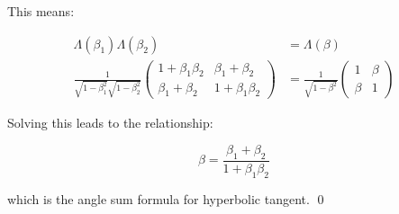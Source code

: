 \documentclass[12pt]{article}
\begin{document}
This means:

\begin{equation}
    \begin{split}
        \Lambda(\beta_{1}) \Lambda(\beta_{2}) &= \Lambda(\beta) \\
        \frac{1}{\sqrt{1 - \beta_{1}^{2}} \sqrt{1 - \beta_{2}^{2}}} \begin{pmatrix}
            1 + \beta_{1} \beta_{2} & \beta_{1} + \beta_{2}   \\
            \beta_{1} + \beta_{2}   & 1 + \beta_{1} \beta_{2}
        \end{pmatrix}
        &=
        \frac{1}{\sqrt{1 - \beta^{2}}} \begin{pmatrix}
            1     & \beta \\
            \beta & 1
        \end{pmatrix}
    \end{split}
\end{equation}

Solving this leads to the relationship:

\begin{equation}
    \beta = \frac{\beta_{1} + \beta_{2}}{1 + \beta_{1} \beta_{2}}
\end{equation}

which is the angle sum formula for hyperbolic tangent.
\qed
\end{document}
